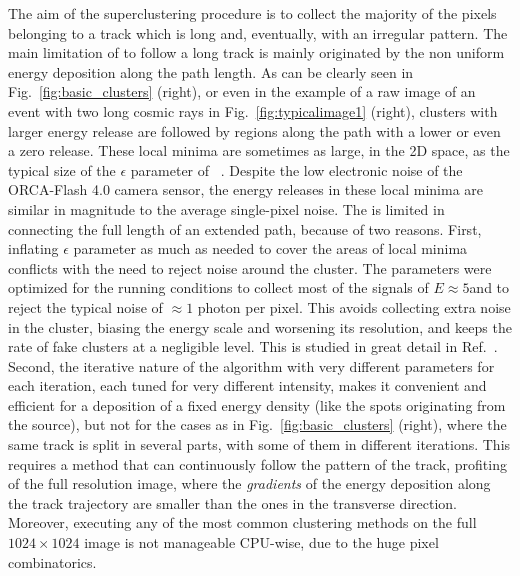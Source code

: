 The aim of the superclustering procedure is to collect the majority of
the pixels belonging to a track which is long and, eventually, with
an irregular pattern. The main limitation of \idbscan to follow a long
track is mainly originated by the non uniform energy deposition along
the path length.  As can be clearly seen in
Fig.~\ref{fig:basic_clusters} (right), or even in the example of a raw
image of an event with two long cosmic rays in
Fig.~\ref{fig:typicalimage1} (right), clusters with larger energy
release are followed by regions along the path with a lower or even a
zero release.  These local minima are sometimes as large, in the 2D
space, as the typical size of the $\epsilon$ parameter of
\dbscan~\cite{dbscan}. Despite the low electronic noise of the
ORCA-Flash 4.0 camera sensor, the energy releases in these local
minima are similar in magnitude to the average single-pixel noise.
The \idbscan is limited in connecting the full length of an extended
path, because of two reasons. First, inflating $\epsilon$ parameter as
much as needed to cover the areas of local minima conflicts with the
need to reject noise around the cluster.  The \idbscan parameters were
optimized for the \lemon running conditions to collect most of the
signals of $E \approx 5$\keV and to reject the typical noise of
$\approx 1$ photon per pixel. This avoids collecting extra noise in
the cluster, biasing the energy scale and worsening its resolution,
and keeps the rate of fake clusters at a negligible level.  This is
studied in great detail in Ref.~\cite{iDBSCAN}.  Second, the iterative
nature of the algorithm with very different parameters for each
iteration, each tuned for very different intensity, makes it
convenient and efficient for a deposition of a fixed energy density
(like the spots originating from the \fe source), but not for the
cases as in Fig.~\ref{fig:basic_clusters} (right), where the same
track is split in several parts, with some of them in different
iterations.  This requires a method that can continuously follow the
pattern of the track, profiting of the full resolution image, where
the {\it gradients} of the energy deposition along the track
trajectory are smaller than the ones in the transverse
direction. Moreover, executing any of the most common clustering methods on the
full $1024\times1024$ image is not manageable CPU-wise, due to the huge
pixel combinatorics.

